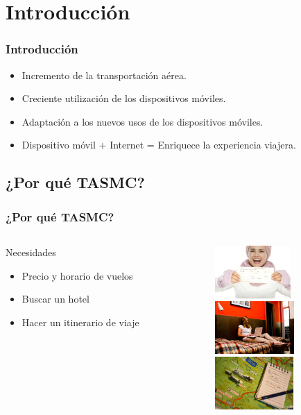 \documentclass[12pt]{beamer}
\begin{document}
\section{Introducción}

\begin{frame}
	\frametitle{Introducción}
	\begin{block}{}
		\begin{itemize}
		\item Incremento de la transportación aérea.
		\item Creciente utilización de los dispositivos móviles.
		\item Adaptación a los nuevos usos de los dispositivos móviles.
		\item Dispositivo móvil + Internet = Enriquece la experiencia viajera.
	\end{itemize}
	\end{block}

\end{frame}

\subsection{¿Por qué TASMC?}
\begin{frame}
	\frametitle{¿Por qué TASMC?}
	\begin{columns} 
		\begin{column}{5cm} 
			\begin{block}{Necesidades} \small 
				\begin{itemize}
					\item Precio y horario de vuelos
					\item Buscar un hotel
					\item Hacer un itinerario de viaje
				\end{itemize} 
			\end{block} 
		\end{column}
		\begin{column}{5cm} 
			\begin{center}
				\includegraphics[height=2cm]{imagenes/nvuelo.jpg} \\
				\includegraphics[height=2cm]{imagenes/nhotel.jpg} \\
				\includegraphics[height=2cm]{imagenes/nitinerario.jpg}
			\end{center} 
		\end{column} 
	\end{columns}
\end{frame}
\end{document}

